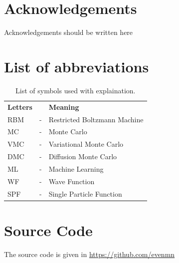 \thispagestyle{empty}
\clearpage

\thispagestyle{empty}
\clearpage

\section*{Acknowledgements}
    Acknowledgements should be written here
    
\thispagestyle{empty}
\clearpage

{%
    \tableofcontents
    \thispagestyle{empty}
    \clearpage}%

\thispagestyle{empty}
\clearpage

\section*{List of abbreviations}
\begin{table}[H]
    \centering
    \begin{tabular}{lcl}
        \textbf{Letters} & & \textbf{Meaning} \\
        RBM & - & Restricted Boltzmann Machine \\
        MC & - & Monte Carlo \\
        VMC & - & Variational Monte Carlo \\
        DMC & - & Diffusion Monte Carlo \\
        ML & - & Machine Learning \\
        WF & - & Wave Function \\
        SPF & - & Single Particle Function \\

    \end{tabular}
    \caption{List of symbols used with explaination.}
    \label{tab:symbols}
\end{table}
\thispagestyle{empty}
\clearpage

\section*{Source Code}
    The source code is given in \url{https://github.com/evenmn}

\thispagestyle{empty}
\clearpage

